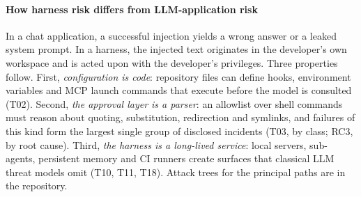 

\paragraph*{How harness risk differs from LLM-application risk} In a chat application, a successful injection yields a wrong answer or a leaked system prompt. In a harness, the injected text originates in the developer's own workspace and is acted upon with the developer's privileges. Three properties follow. First, \emph{configuration is code}: repository files can define hooks, environment variables and MCP launch commands that execute before the model is consulted (T02). Second, \emph{the approval layer is a parser}: an allowlist over shell commands must reason about quoting, substitution, redirection and symlinks, and failures of this kind form the largest single group of disclosed incidents (T03, \pctTopThree{} by class; RC3, \pctRCThree{} by root cause). Third, \emph{the harness is a long-lived service}: local servers, sub-agents, persistent memory and CI runners create surfaces that classical LLM threat models omit (T10, T11, T18). Attack trees for the principal paths are in the repository.
